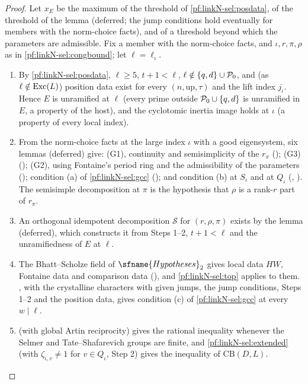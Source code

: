 \begin{proof}
Let $x_E$ be the maximum of the threshold of \cref{pf:linkN-sel:posdata}, of the threshold of the lemma
 (deferred; the jump conditions hold eventually for members with the norm-choice facts), and of a
threshold beyond which the parameters are admissible. Fix a member with the norm-choice facts, and $\iota,r,\pi,\rho$ as in
\cref{pf:linkN-sel:congbound}; let $\ell=\ell_\iota$.
\begin{enumerate}[label=\textit{Step \arabic*.},leftmargin=*]
\item By \cref{pf:linkN-sel:posdata}, $\ell\ge5$, $t+1<\ell$, $\ell\notin\{q,d\}\cup\mathcal P_0$, and (as $\ell\notin\mathrm{Exc}(L)$) position data
exist for every $(n,\mathrm{up},\tau)$ and the lift index $j_\iota$. Hence $E$ is unramified at $\ell$ (every prime outside $\mathcal P_0\cup\{q,d\}$
is unramified in $E$, a property of the host), and the cyclotomic inertia image holds at $\iota$ (a property of every local index).
\item From the norm-choice facts at the large index $\iota$ with a good eigensystem, six lemmas (deferred) give: (G1), continuity and
semisimplicity of the $r_x$ (); (G3)
(); (G2), using Fontaine's period ring and the admissibility of the parameters
(); condition (a) of \cref{pf:linkN-sel:gcc}
(); and condition (b) at $S_\iota$ and at $Q_\iota$
(, ). The
semisimple decomposition at $\pi$ is the hypothesis that $\rho$ is a rank-$r$ part of $r_\pi$.
\item An orthogonal idempotent decomposition $\mathcal S$ for $(r,\rho,\pi)$ exists by the lemma
 (deferred), which constructs it from Steps 1--2, $t+1<\ell$ and
the unramifiedness of $E$ at $\ell$.
\item The Bhatt--Scholze field of $\sfname{Hypotheses}_2$ gives local data $HW$, Fontaine data and comparison data
(), and \cref{pf:linkN-sel:top} applies to them.
, with the crystalline characters with given jumps, the jump conditions, Steps 1--2 and the position data, gives condition
(c) of \cref{pf:linkN-sel:gcc} at every $w\mid\ell$.
\item {} (with global Artin reciprocity) gives the rational inequality whenever the Selmer and Tate--Shafarevich groups are
finite, and \cref{pf:linkN-sel:extended} (with $\zeta_{\iota,v}\ne1$ for $v\in Q_\iota$, Step 2) gives the inequality of $\mathrm{CB}(D,L)$.\qedhere
\end{enumerate}
\end{proof}

